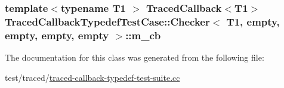 \subsubsection[{\texorpdfstring{m\+\_\+cb}{m_cb}}]{\setlength{\rightskip}{0pt plus 5cm}template$<$typename T1 $>$ {\bf Traced\+Callback}$<$T1$>$ {\bf Traced\+Callback\+Typedef\+Test\+Case\+::\+Checker}$<$ T1, {\bf empty}, {\bf empty}, {\bf empty}, {\bf empty} $>$\+::m\+\_\+cb\hspace{0.3cm}{\ttfamily [private]}}\hypertarget{classTracedCallbackTypedefTestCase_1_1Checker_3_01T1_00_01empty_00_01empty_00_01empty_00_01empty_01_4_af5731518e488980c5e381659ae32ae8d}{}\label{classTracedCallbackTypedefTestCase_1_1Checker_3_01T1_00_01empty_00_01empty_00_01empty_00_01empty_01_4_af5731518e488980c5e381659ae32ae8d}


The documentation for this class was generated from the following file\+:\begin{DoxyCompactItemize}
\item 
test/traced/\hyperlink{traced-callback-typedef-test-suite_8cc}{traced-\/callback-\/typedef-\/test-\/suite.\+cc}\end{DoxyCompactItemize}
